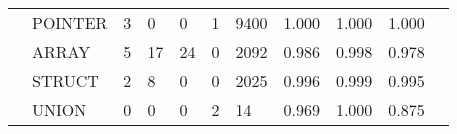 \begin{table*}[t]
\begin{tabular}{lp{1.2cm}p{1.2cm}p{1.2cm}p{1.2cm}p{1.2cm}p{1.2cm}p{1.2cm}p{1.2cm}p{1.2cm}p{1.2cm}}
      & POINTER &                                  3 &                                 0 &                                0 &                                 1 &                            9400 &                           1.000 &                                  1.000 &                                1.000 \\
      & ARRAY &                                  5 &                                17 &                               24 &                                 0 &                            2092 &                           0.986 &                                  0.998 &                                0.978 \\
      & STRUCT &                                  2 &                                 8 &                                0 &                                 0 &                            2025 &                           0.996 &                                  0.999 &                                0.995 \\
      & UNION &                                  0 &                                 0 &                                0 &                                 2 &                              14 &                           0.969 &                                  1.000 &                                0.875 \\
\bottomrule
\end{tabular}
\end{table*}

